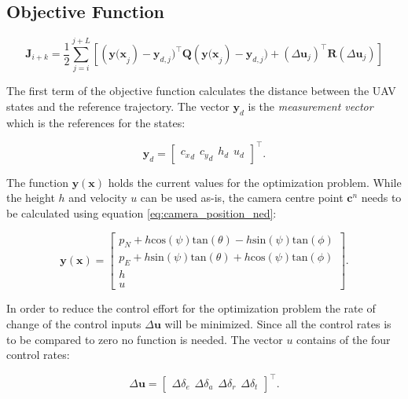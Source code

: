 \subsection{Objective Function}

\begin{equation}
	\label{eq:objective_function}
	\mathbf{J}_{i+k} = \frac{1}{2} \sum_{j=i}^{j+L} [(\mathbf{y(\mathbf{x}}_j)-\mathbf{y}_{d,j})^\intercal \mathbf{Q}(\mathbf{y(\mathbf{x}}_j)-\mathbf{y}_{d,j}) + (\Delta\mathbf{u}_j)^\intercal \mathbf{R}(\Delta\mathbf{u}_j)]
\end{equation}

The first term of the objective function calculates the distance between the UAV states and the reference trajectory. The vector $\mathbf{y}_d$ is the \textit{measurement vector} which is the references for the states:
	
\begin{equation}
	\mathbf{y}_d =
	\begin{bmatrix}
		{c_x}_d \hspace{5pt} {c_y}_d \hspace{5pt} h_d \hspace{5pt} u_d
	\end{bmatrix}^\intercal .
\end{equation}

The function $\mathbf{y}(\mathbf{x})$ holds the current values for the optimization problem. While the height $h$ and velocity $u$ can be used as-is, the camera centre point $\mathbf{c}^n$ needs to be calculated using equation \ref{eq:camera_position_ned}:

\begin{equation}
	\mathbf{y}(\mathbf{x}) =
	\begin{bmatrix}
		p_N + h\text{cos}(\psi)\text{tan}(\theta) - h\text{sin}(\psi)\text{tan}(\phi)\\
		p_E + h\text{sin}(\psi)\text{tan}(\theta) + h\text{cos}(\psi)\text{tan}(\phi)\\
		h \\
		u
	\end{bmatrix}.
\end{equation}

In order to reduce the control effort for the optimization problem the rate of change of the control inputs $\Delta\mathbf{u}$ will be minimized. Since all the control rates is to be compared to zero no function is needed. The vector $u$ contains of the four control rates:

\begin{equation}
	\label{eq:control_rates}
	\Delta\mathbf{u} = 
	\begin{bmatrix}
		\Delta\delta_e \hspace{5pt} \Delta\delta_a \hspace{5pt} \Delta\delta_r \hspace{5pt} \Delta\delta_t
	\end{bmatrix} ^\intercal .
\end{equation}

